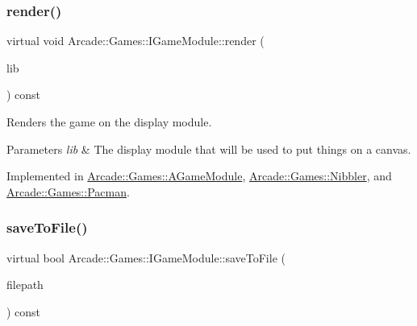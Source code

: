 \subsubsection{\texorpdfstring{render()}{render()}}
{\footnotesize\ttfamily virtual void Arcade\+::\+Games\+::\+I\+Game\+Module\+::render (\begin{DoxyParamCaption}\item[{\mbox{\hyperlink{classArcade_1_1Display_1_1IDisplayModule}{Arcade\+::\+Display\+::\+I\+Display\+Module}} \&}]{lib }\end{DoxyParamCaption}) const\hspace{0.3cm}{\ttfamily [pure virtual]}}



Renders the game on the display module. 


\begin{DoxyParams}{Parameters}
{\em lib} & The display module that will be used to put things on a canvas. \\
\hline
\end{DoxyParams}


Implemented in \mbox{\hyperlink{classArcade_1_1Games_1_1AGameModule_a5897780d42d5faba3287c29b87f2b498}{Arcade\+::\+Games\+::\+A\+Game\+Module}}, \mbox{\hyperlink{classArcade_1_1Games_1_1Nibbler_afd52ee2fad66523b58f94f9eb582145e}{Arcade\+::\+Games\+::\+Nibbler}}, and \mbox{\hyperlink{classArcade_1_1Games_1_1Pacman_ab1a7408f265efbef12b4f9d1a6fb4512}{Arcade\+::\+Games\+::\+Pacman}}.

\mbox{\label{classArcade_1_1Games_1_1IGameModule_a3cf053ce2f4ccfe13e9c10d8549f7c82}} 
\subsubsection{\texorpdfstring{saveToFile()}{saveToFile()}\hspace{0.1cm}{\footnotesize\ttfamily [1/2]}}
{\footnotesize\ttfamily virtual bool Arcade\+::\+Games\+::\+I\+Game\+Module\+::save\+To\+File (\begin{DoxyParamCaption}\item[{const std\+::string \&}]{filepath }\end{DoxyParamCaption}) const\hspace{0.3cm}{\ttfamily [pure virtual]}}



